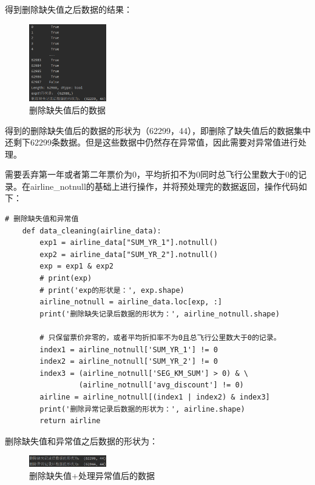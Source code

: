 \documentclass[UTF8,12pt]{article}
\begin{document}
得到删除缺失值之后数据的结果：

\begin{figure}[htbp]
    \centering
    \includegraphics[width=0.3\textwidth]{img/6.png}
    \caption{删除缺失值后的数据}
\end{figure}

得到的删除缺失值后的数据的形状为（62299，44），即删除了缺失值后的数据集中还剩下62299条数据。但是这些数据中仍然存在异常值，因此需要对异常值进行处理。

需要丢弃第一年或者第二年票价为0，平均折扣不为0同时总飞行公里数大于0的记录。在airline\_notnull的基础上进行操作，并将预处理完的数据返回，操作代码如下：

\begin{lstlisting}[title=删除缺失值+处理异常值,frame=shadowbox]
    # 删除缺失值和异常值
    def data_cleaning(airline_data):
        exp1 = airline_data["SUM_YR_1"].notnull()
        exp2 = airline_data["SUM_YR_2"].notnull()
        exp = exp1 & exp2
        # print(exp)
        # print('exp的形状是：', exp.shape)
        airline_notnull = airline_data.loc[exp, :]
        print('删除缺失记录后数据的形状为：', airline_notnull.shape)
    
        # 只保留票价非零的，或者平均折扣率不为0且总飞行公里数大于0的记录。
        index1 = airline_notnull['SUM_YR_1'] != 0
        index2 = airline_notnull['SUM_YR_2'] != 0
        index3 = (airline_notnull['SEG_KM_SUM'] > 0) & \
                 (airline_notnull['avg_discount'] != 0)
        airline = airline_notnull[(index1 | index2) & index3]
        print('删除异常记录后数据的形状为：', airline.shape)
        return airline
\end{lstlisting}

删除缺失值和异常值之后数据的形状为：

\begin{figure}[htbp]
    \centering
    \includegraphics[width=0.3\textwidth]{img/7.png}
    \caption{删除缺失值+处理异常值后的数据}
\end{figure}
\end{document}
